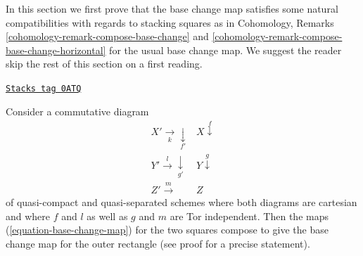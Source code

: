 \medskip\noindent
In this section we first prove that the base change map satisfies
some natural compatibilities with regards to stacking squares as in
Cohomology, Remarks \ref{cohomology-remark-compose-base-change} and
\ref{cohomology-remark-compose-base-change-horizontal} for the usual
base change map. We suggest the reader skip the rest of this section
on a first reading.

\begin{lemma}
\label{duality-lemma-compose-base-change-maps}
\href{https://stacks.math.columbia.edu/tag/0ATQ}{\texttt{Stacks tag 0ATQ}}

Consider a commutative diagram
$$
\begin{array}{cc}X' \underset{k}{\longrightarrow}\underset{f'}{\downarrow} & X \overset{f}{\downarrow} \\ Y' \overset{l}{\longrightarrow}\underset{g'}{\downarrow} & Y \overset{g}{\downarrow} \\ Z' \overset{m}{\longrightarrow} & Z\end{array}
$$
of quasi-compact and quasi-separated schemes where
both diagrams are cartesian and where $f$ and $l$
as well as $g$ and $m$ are Tor independent.
Then the maps (\ref{equation-base-change-map})
for the two squares compose to give the base
change map for the outer rectangle (see proof for a precise statement).
\end{lemma}

